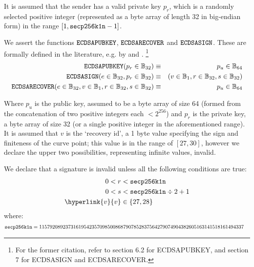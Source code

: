 \documentclass[9pt,oneside]{amsart}
\makeatletter
\newcommand*\eg{e.g.\@\xspace}
\makeatother
\begin{document}
It is assumed that the sender has a valid private key $p_r$, which is a randomly selected positive integer (represented as a byte array of length 32 in big-endian form) in the range \hbox{$[1, \mathtt{\tiny secp256k1n} - 1]$}.

We assert the functions $\mathtt{\small ECDSAPUBKEY}$, $\mathtt{\small ECDSARECOVER}$ and $\mathtt{\small ECDSASIGN}$. These are formally defined in the literature, \eg by \cite{ECDSAcerticom} and \cite{ECDSAWikipedia}. \footnote{For the former citation, refer to section 6.2 for ECDSAPUBKEY, and section 7 for ECDSASIGN and ECDSARECOVER.} %
\begin{eqnarray}
\mathtt{\small ECDSAPUBKEY}(p_r \in \mathbb{B}_{32}) & \equiv & p_u \in \mathbb{B}_{64} \\
\mathtt{\small ECDSASIGN}(e \in \mathbb{B}_{32}, p_r \in \mathbb{B}_{32}) & \equiv & (v \in \mathbb{B}_{1}, r \in \mathbb{B}_{32}, s \in \mathbb{B}_{32}) \\
\mathtt{\small ECDSARECOVER}(e \in \mathbb{B}_{32}, v \in \mathbb{B}_{1}, r \in \mathbb{B}_{32}, s \in \mathbb{B}_{32}) & \equiv & p_u \in \mathbb{B}_{64}
\end{eqnarray}

Where $p_u$ is the public key, assumed to be a byte array of size 64 (formed from the concatenation of two positive integers each $< 2^{256}$) and $p_r$ is the private key, a byte array of size 32 (or a single positive integer in the aforementioned range)\hypertarget{v}{. It is assumed that $v$ is the `recovery id', a 1 byte value specifying the sign and finiteness of the curve point; this value is in the range of $[27, 30]$, however we declare the upper two possibilities, representing infinite values, invalid.}

\newcommand{\slimit}{\ensuremath{\text{s-limit}}}

We declare that a signature is invalid unless all the following conditions are true:
\begin{align}
0 < r &< \mathtt{\tiny secp256k1n} \\
0 < s &< \mathtt{\tiny secp256k1n} \div 2 + 1 \\
\hyperlink{v}{v} &\in \{27,28\}
\end{align}
where:
\begin{align}
\mathtt{\tiny secp256k1n} &= 115792089237316195423570985008687907852837564279074904382605163141518161494337
\end{align}
\end{document}
